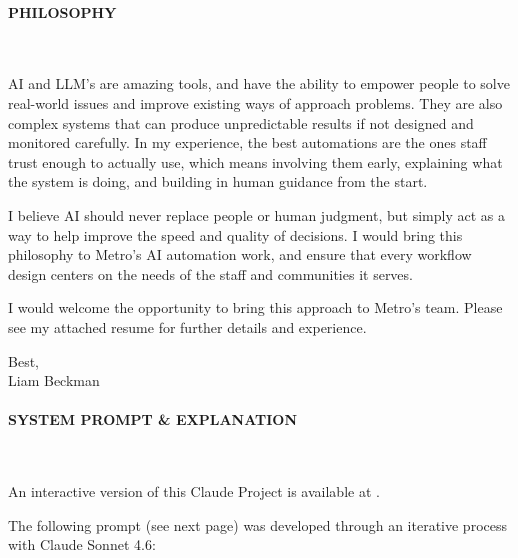 \paragraph{PHILOSOPHY}\

\vspace*{\baselineskip}

AI and LLM's are amazing tools, and have the ability to empower people to solve real-world issues and improve existing ways of approach problems. They are also complex systems that can produce unpredictable results if not designed and monitored carefully. In my experience, the best automations are the ones staff trust enough to actually use, which means involving them early, explaining what the system is doing, and building in human guidance from the start.

\vspace*{\baselineskip}

I believe AI should never replace people or human judgment, but simply act as a way to help improve the speed and quality of decisions. I would bring this philosophy to Metro's AI automation work, and ensure that every workflow design centers on the needs of the staff and communities it serves.

\vspace*{\baselineskip}

I would welcome the opportunity to bring this approach to Metro's team. Please see my attached resume for further details and experience.

\vspace*{\baselineskip}

Best,\\

Liam Beckman

\vfill \myBreak{}


\newpage

\paragraph{SYSTEM PROMPT \& EXPLANATION}\

\vspace*{\baselineskip}

\begin{mytip}
An interactive version of this Claude Project is available at .
\end{mytip}

The following prompt (see next page) was developed through an iterative process with Claude Sonnet 4.6:

